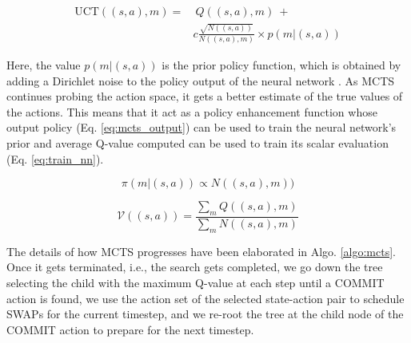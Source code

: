 \documentclass[%
 reprint,
amsmath,amssymb,
pra,
]{revtex4-2}
\begin{document}
\begin{equation}\label{eq:uct}
\begin{split}
    \textrm{UCT}((s,a), m) =&\ Q((s,a), m)\ + \\ & c \frac{\sqrt{N((s,a))}}{N((s,a), m)} \times p(m \vert (s,a))
\end{split}
\end{equation}

Here, the value $p(m | (s,a))$ is the prior policy function, which is obtained by adding a Dirichlet noise to the policy output of the neural network \citep{mcts_alphazero}. As MCTS continues probing the action space, it gets a better estimate of the true values of the actions. This means that it act as a policy enhancement function whose output policy (Eq. \ref{eq:mcts_output}) can be used to train the neural network's prior and average Q-value computed can be used to train its scalar evaluation (Eq. \ref{eq:train_nn}).

\begin{equation}\label{eq:mcts_output}
    \pi(m | (s,a)) \propto N((s, a), m))
\end{equation}

\begin{equation}\label{eq:train_nn}
    \mathcal{V}((s,a)) = \frac{\sum_{m} Q((s,a), m)}{\sum_{m} N((s,a), m)}
\end{equation}

The details of how MCTS progresses have been elaborated in Algo. \ref{algo:mcts}. Once it gets terminated, i.e., the search gets completed, we go down the tree selecting the child with the maximum Q-value at each step until a COMMIT action is found, we use the action set of the selected state-action pair to schedule SWAPs for the current timestep, and we re-root the tree at the child node of the COMMIT action to prepare for the next timestep.
\end{document}
